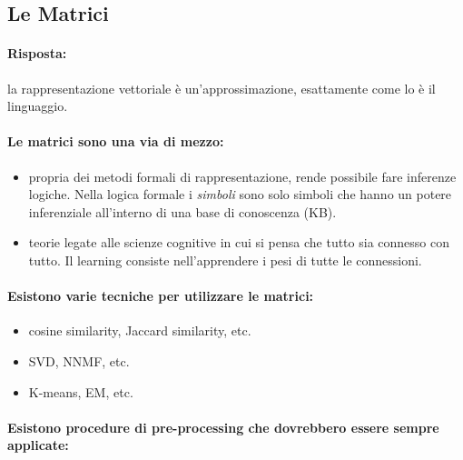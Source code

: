\subsection{Le Matrici}


\paragraph{Risposta:} la rappresentazione vettoriale è un'approssimazione, esattamente come lo è il linguaggio. 

\paragraph{Le matrici sono una via di mezzo:}

\begin{itemize}
  \item {} propria dei metodi formali di rappresentazione, rende possibile fare inferenze logiche. Nella logica formale i \textit{simboli} sono solo simboli che hanno un potere inferenziale all'interno di una base di conoscenza (KB). 
  \item {} teorie legate alle scienze cognitive in cui si pensa che tutto sia connesso con tutto. Il learning consiste nell'apprendere i pesi di tutte le connessioni.
\end{itemize}


\paragraph{Esistono varie tecniche per utilizzare le matrici:}

\begin{itemize}
  \item {} cosine similarity, Jaccard similarity, etc. 
  \item {} SVD, NNMF, etc. 
  \item {} K-means, EM, etc.
\end{itemize}

\paragraph{Esistono procedure di pre-processing che dovrebbero essere sempre applicate:}


